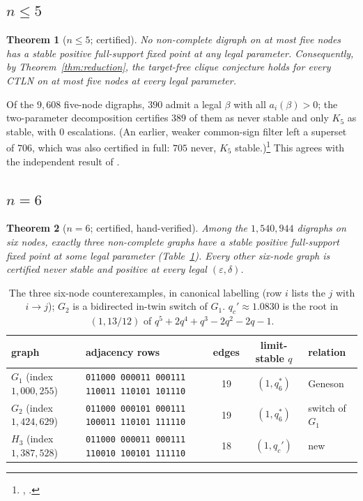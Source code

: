 \documentclass[11pt]{article}
\newtheorem{theorem}{Theorem}[section]
\theoremstyle{definition}
\newcommand{\eps}{\varepsilon}
\begin{document}
\subsection{\texorpdfstring{$n\le5$}{n <= 5}}
\begin{theorem}[$n\le5$; certified]\label{thm:n5}
No non-complete digraph on at most five nodes has a stable positive full-support fixed point at any legal parameter.
Consequently, by Theorem~\ref{thm:reduction}, the target-free clique conjecture holds for every CTLN on at most five
nodes at every legal parameter.
\end{theorem}
Of the $9{,}608$ five-node digraphs, $390$ admit a legal $\beta$ with all $a_i(\beta)>0$; the two-parameter
decomposition certifies $389$ of them as never stable and only $K_5$ as stable, with $0$ escalations. (An earlier,
weaker common-sign filter left a superset of $706$, which was also certified in full: $705$ never, $K_5$
stable.)\footnote{, .}
This agrees with the independent result of \cite{SixIsMinimal2026}.

\subsection{\texorpdfstring{$n=6$}{n = 6}}
\begin{theorem}[$n=6$; certified, hand-verified]\label{thm:n6}
Among the $1{,}540{,}944$ digraphs on six nodes, exactly three non-complete graphs have a stable positive full-support
fixed point at some legal parameter (Table~\ref{tab:n6}). Every other six-node graph is certified never stable and
positive at every legal $(\eps,\delta)$.
\end{theorem}

\begin{table}[ht]
\centering
\footnotesize
\begin{tabular}{@{}llccl@{}}
\toprule
graph & adjacency rows & edges & limit-stable $q$ & relation\\
\midrule
$G_1$ (index $1{,}000{,}255$) & \texttt{011000 000011 000111 110011 110101 101110} & 19 & $(1,q_6^*)$ & Geneson\\
$G_2$ (index $1{,}424{,}629$) & \texttt{011000 000101 000111 100011 110101 111110} & 19 & $(1,q_6^*)$ & switch of $G_1$\\
$H_3$ (index $1{,}387{,}528$) & \texttt{011000 000011 000111 110010 100101 111110} & 18 & $(1,q_c')$ & new\\
\bottomrule
\end{tabular}
\caption{The three six-node counterexamples, in canonical labelling (row $i$ lists the $j$ with $i\to j$); $G_2$ is a
bidirected in-twin switch of $G_1$. $q_c'\approx1.0830$ is the root in $(1,13/12)$ of
$q^5+2q^4+q^3-2q^2-2q-1$.}\label{tab:n6}
\end{table}
\end{document}
